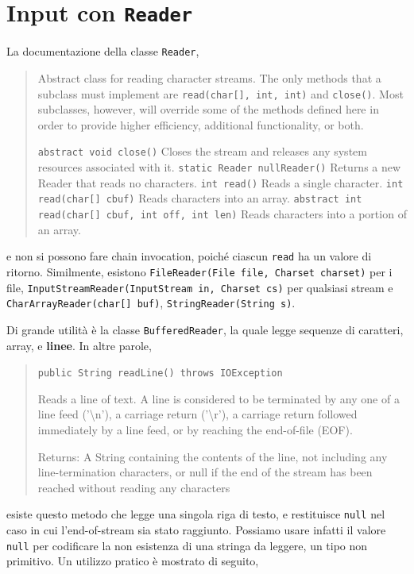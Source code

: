 \documentclass[\fontsizeclass,twocolumn]{\classname}
\theoremstyle{definition}
\theoremstyle{definition}
\begin{document}
\section{Input con \texttt{Reader}}

La documentazione della classe \texttt{Reader},

\begin{quote}
    \footnotesize{Abstract class for reading character streams. The only
        methods that a subclass must implement are \texttt{read(char[], int, int)} and
        \texttt{close()}. Most subclasses, however, will override some of the methods
        defined here in order to provide higher efficiency, additional
        functionality, or both.

\texttt{abstract void 	close()} 	Closes the stream and releases any system resources associated with it.
\texttt{static Reader 	nullReader()} 	Returns a new Reader that reads no characters.
\texttt{int 	read()} 	Reads a single character.
\texttt{int 	read(char[] cbuf)} 	Reads characters into an array.
\texttt{abstract int 	read(char[] cbuf, int off, int len)} 	Reads characters into a portion of an array.}
\end{quote}

e non si possono fare chain invocation, poiché ciascun \texttt{read} ha un
valore di ritorno. Similmente, esistono \texttt{FileReader(File file, Charset
charset)} per i file, \texttt{InputStreamReader(InputStream in, Charset cs)}
per qualsiasi stream e \texttt{CharArrayReader(char[] buf)},
\texttt{StringReader(String s)}.

Di grande utilità è la classe \texttt{BufferedReader}, la quale legge sequenze
di caratteri, array, e \textbf{linee}. In altre parole, 

\begin{quote}
    \footnotesize{\texttt{public String readLine() throws IOException}

Reads a line of text. A line is considered to be terminated by any one of a line feed ('\textbackslash n'), a carriage return ('\textbackslash r'), a carriage return followed immediately by a line feed, or by reaching the end-of-file (EOF).

Returns:
A String containing the contents of the line, not including any line-termination characters, or null if the end of the stream has been reached without reading any characters
}
\end{quote}

esiste questo metodo che legge una singola riga di testo, e restituisce
\texttt{null} nel caso in cui l'end-of-stream sia stato raggiunto. Possiamo
usare infatti il valore \texttt{null} per codificare la non esistenza di una
stringa da leggere, un tipo non primitivo. Un utilizzo pratico è mostrato di
seguito,
\end{document}
